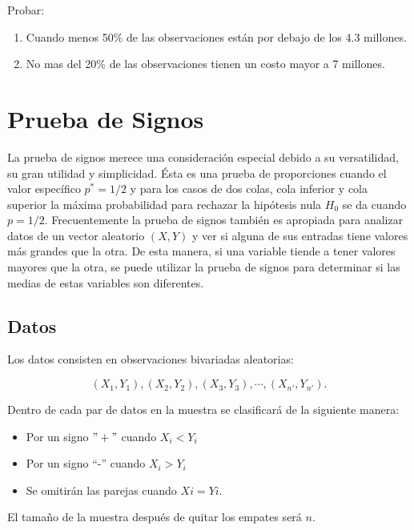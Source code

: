 \documentclass[
  a4paper,
  oneside,
  openany]{book}
\providecommand{\tightlist}{%
  \setlength{\itemsep}{0pt}\setlength{\parskip}{0pt}}
\begin{document}
Probar:

\begin{enumerate}
\def\labelenumi{\alph{enumi})}
\item
  Cuando menos 50\% de las observaciones están por debajo de los 4.3 millones.
\item
  No mas del 20\% de las observaciones tienen un costo mayor a 7 millones.
\end{enumerate}

\hypertarget{prueba-de-signos}{%
\chapter{Prueba de Signos}\label{prueba-de-signos}}

La prueba de signos merece una consideración especial debido a su versatilidad, su gran utilidad y simplicidad. Ésta es una prueba de proporciones cuando el valor específico \(p^*=1/2\) y para los casos de dos colas, cola inferior y cola superior la máxima probabilidad para rechazar la hipótesis nula \(H_0\) se da cuando \(p = 1/2\). Frecuentemente la prueba de signos también es apropiada para analizar datos de un vector aleatorio \((X,Y)\) y ver si alguna de sus entradas tiene valores más grandes que la otra. De esta manera, si una variable tiende a tener valores mayores que la otra, se puede utilizar la prueba de signos para determinar si las medias de estas variables son diferentes.

\hypertarget{datos-2}{%
\section{Datos}\label{datos-2}}

Los datos consisten en observaciones bivariadas aleatorias:

\[(X_{1},Y_{1}),(X_{2},Y_{2}),(X_{3},Y_{3}),\cdots,(X_{n'},Y_{n'}).\]

Dentro de cada par de datos en la muestra se clasificará de la siguiente manera:

\begin{itemize}
\tightlist
\item
  Por un signo \("+"\) cuando \(X_{i} < Y_{i}\)
\item
  Por un signo ``-'' cuando \(X_{i} > Y_{i}\)
\item
  Se omitirán las parejas cuando \(Xi = Yi\).
\end{itemize}

El tamaño de la muestra después de quitar los empates será \(n\).
\end{document}

